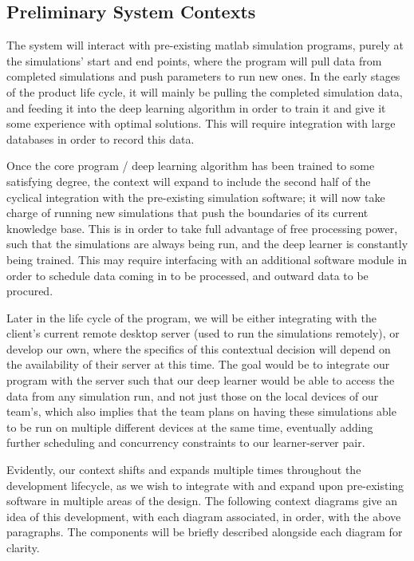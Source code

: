 \documentclass[12pt, titlepage]{article}
\begin{document}
\subsection{Preliminary System Contexts}
The system will interact with pre-existing matlab simulation programs, purely at the simulations’ start and end points, where the program will pull data from completed simulations and push parameters to run new ones. In the early stages of the product life cycle, it will mainly be pulling the completed simulation data, and feeding it into the deep learning algorithm in order to train it and give it some experience with optimal solutions. This will require integration with large databases in order to record this data. 
\par
Once the core program / deep learning algorithm has been trained to some satisfying degree, the context will expand to include the second half of the cyclical integration with the pre-existing simulation software; it will now take charge of running new simulations that push the boundaries of its current knowledge base. This is in order to take full advantage of free processing power, such that the simulations are always being run, and the deep learner is constantly being trained. This may require interfacing with an additional software module in order to schedule data coming in to be processed, and outward data to be procured. 
\par
Later in the life cycle of the program, we will be either integrating with the client's current remote desktop server (used to run the simulations remotely), or develop our own, where the specifics of this contextual decision will depend on the availability of their server at this time. The goal would be to integrate our program with the server such that our deep learner would be able to access the data from any simulation run, and not just those on the local devices of our team's, which also implies that the team plans on having these simulations able to be run on multiple different devices at the same time, eventually adding further scheduling and concurrency constraints to our learner-server pair. 
\par
Evidently, our context shifts and expands multiple times throughout the development lifecycle, as we wish to integrate with and expand upon pre-existing software in multiple areas of the design. The following context diagrams give an idea of this development, with each diagram associated, in order, with the above paragraphs. The components will be briefly described alongside each diagram for clarity.
\newpage
\end{document}
